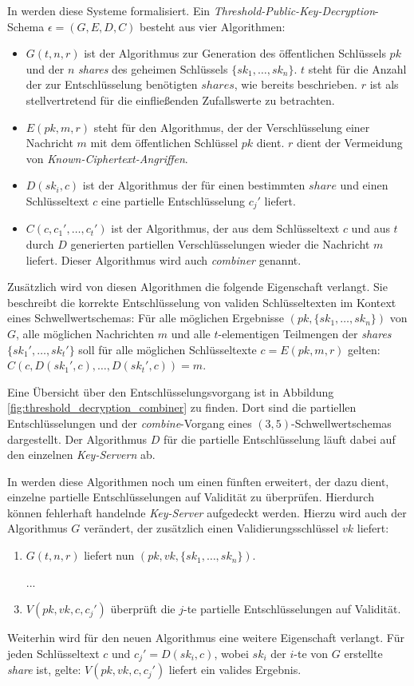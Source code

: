 In \cite{boneh2016} werden diese Systeme formalisiert. Ein \textit{Threshold-Public-Key-Decryption}-Schema \(\epsilon = (G, E, D, C)\) besteht aus vier Algorithmen: 

\begin{itemize}
  \item \(G(t, n, r)\) ist der Algorithmus zur Generation des öffentlichen Schlüssels \(pk\) und der \(n\) \textit{shares} des geheimen Schlüssels \(\{sk_1, \dots, sk_n\}\). \(t\) steht für die Anzahl der zur Entschlüsselung benötigten \(shares\), wie bereits beschrieben. \(r\) ist als stellvertretend für die einfließenden Zufallswerte zu betrachten.
  
  \item \(E(pk, m, r)\) steht für den Algorithmus, der der Verschlüsselung einer Nachricht \(m\) mit dem öffentlichen Schlüssel \(pk\) dient. \(r\) dient der Vermeidung von \textit{Known-Ciphertext-Angriffen}. 
  
  \item \(D(sk_i, c)\) ist der Algorithmus der für einen bestimmten \(share\) und einen Schlüsseltext \(c\) eine partielle Entschlüsselung \(c_j'\) liefert.
  
  \item \(C(c, c_1', \dots, c_t')\) ist der Algorithmus, der aus dem Schlüsseltext \(c\) und aus \(t\) durch \(D\) generierten partiellen Verschlüsselungen wieder die Nachricht \(m\) liefert. Dieser Algorithmus wird auch \textit{combiner} genannt. 
\end{itemize}

Zusätzlich wird von diesen Algorithmen die folgende Eigenschaft verlangt. Sie beschreibt die korrekte Entschlüsselung von validen Schlüsseltexten im Kontext eines Schwellwertschemas: Für alle möglichen Ergebnisse \((pk, \{sk_1, \dots, sk_n\})\) von \(G\), alle möglichen Nachrichten \(m\) und alle \(t\)-elementigen Teilmengen der \textit{shares} \(\{sk_1', \dots, sk_t'\}\) soll für alle möglichen Schlüsseltexte \(c=E(pk, m, r)\) gelten: \(C(c, D(sk_1', c), \dots, D(sk_t', c)) = m\).

Eine Übersicht über den Entschlüsselungsvorgang ist in Abbildung \ref{fig:threshold_decryption_combiner} zu finden. Dort sind die partiellen Entschlüsselungen und der \textit{combine}-Vorgang eines \((3,5)\)-Schwellwertschemas dargestellt. Der Algorithmus \(D\) für die partielle Entschlüsselung läuft dabei auf den einzelnen \textit{Key-Servern} ab.

In \cite{boneh2006} werden diese Algorithmen noch um einen fünften erweitert, der dazu dient, einzelne partielle Entschlüsselungen auf Validität zu überprüfen. Hierdurch können fehlerhaft handelnde \textit{Key-Server} aufgedeckt werden. Hierzu wird auch der Algorithmus \(G\) verändert, der zusätzlich einen Validierungsschlüssel \(vk\) liefert:
\begin{enumerate}
	\item \(G(t, n, r)\) liefert nun \((pk, vk, \{sk_1, \dots, sk_n\})\).
  \item[...] 
  \setcounter{enumi}{4}
	\item \(V(pk, vk, c, c_j')\) überprüft die \(j\)-te partielle Entschlüsselungen auf Validität.
\end{enumerate}

Weiterhin wird für den neuen Algorithmus eine weitere Eigenschaft verlangt. Für jeden Schlüsseltext \(c\) und \(c_j' = D(sk_i,c)\), wobei \(sk_i\) der \(i\)-te von \(G\) erstellte \textit{share} ist, gelte: \(V(pk, vk, c, c_j')\) liefert ein valides Ergebnis.